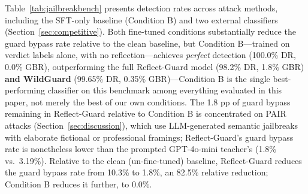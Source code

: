 \documentclass[superintelligence,article,submit,pdftex,moreauthors]{Definitions/mdpi}
\begin{document}
Table~\ref{tab:jailbreakbench} presents detection rates across attack methods, including the SFT-only baseline (Condition B) and two external classifiers (Section~\ref{sec:competitive}). Both fine-tuned conditions substantially reduce the guard bypass rate relative to the clean baseline, but Condition B---trained on verdict labels alone, with no reflection---achieves \emph{perfect} detection (100.0\% DR, 0.0\% GBR), outperforming the full Reflect-Guard model (98.2\% DR, 1.8\% GBR) \textbf{and WildGuard} (99.65\% DR, 0.35\% GBR)---Condition B is the single best-performing classifier on this benchmark among everything evaluated in this paper, not merely the best of our own conditions. The 1.8 pp of guard bypass remaining in Reflect-Guard relative to Condition B is concentrated on PAIR attacks (Section~\ref{sec:discussion}), which use LLM-generated semantic jailbreaks with elaborate fictional or professional framings; Reflect-Guard's guard bypass rate is nonetheless lower than the prompted GPT-4o-mini teacher's (1.8\% vs.\ 3.19\%). Relative to the clean (un-fine-tuned) baseline, Reflect-Guard reduces the guard bypass rate from 10.3\% to 1.8\%, an 82.5\% relative reduction; Condition B reduces it further, to 0.0\%.

\begin{table}[H]
  \caption{JailbreakBench detection rates by attack method. DR = detection rate; GBR = guard bypass rate ($=1-\mathrm{DR}$ overall). All prompts are ground-truth harmful; higher DR is better. 95\% bootstrap confidence intervals (2{,}000 resamples) are shown for overall DR for Conditions 0/B/D; WildGuard and Prompted-CoT (external, Section~\ref{sec:competitive}) are single evaluation runs with no CI. Best per row in \textbf{bold} (ties bolded jointly).\label{tab:jailbreakbench}}
  \centering
  \footnotesize
\end{table}
\end{document}
